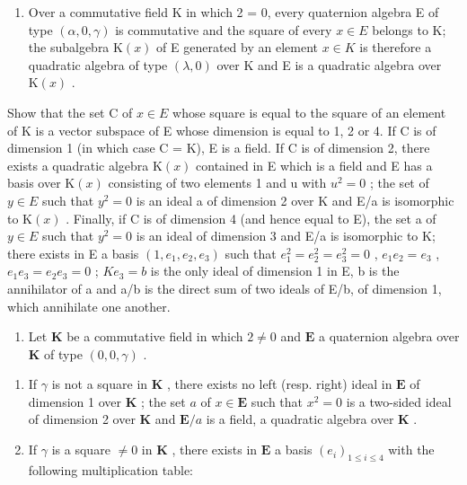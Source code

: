 \begin{enumerate}
\def\labelenumi{\arabic{enumi}.}
\setcounter{enumi}{4}
\tightlist
\item
  Over a commutative field K in which 2 = 0, every quaternion algebra E of type \((\alpha, 0, \gamma)\) is commutative and the square of every \(x \in E\) belongs to K; the subalgebra \(\mathrm{K}(x)\) of E generated by an element \(x \in K\) is therefore a quadratic algebra of type \((\lambda, 0)\) over K and E is a quadratic algebra over \(\mathrm{K}(x)\) .
\end{enumerate}

Show that the set C of \(x \in E\) whose square is equal to the square of an element of K is a vector subspace of E whose dimension is equal to 1, 2 or 4. If C is of dimension 1 (in which case C = K), E is a field. If C is of dimension 2, there exists a quadratic algebra \(\mathrm{K}(x)\) contained in E which is a field and E has a basis over \(\mathrm{K}(x)\) consisting of two elements 1 and u with \(u^{2} = 0\) ; the set of \(y \in E\) such that \(y^{2} = 0\) is an ideal a of dimension 2 over K and E/a is isomorphic to \(\mathrm{K}(x)\) . Finally, if C is of dimension 4 (and hence equal to E), the set a of \(y \in E\) such that \(y^{2} = 0\) is an ideal of dimension 3 and E/a is isomorphic to K; there exists in E a basis \((1, e_{1}, e_{2}, e_{3})\) such that \(e_{1}^{2} = e_{2}^{2} = e_{3}^{2} = 0\) , \(e_{1}e_{2} = e_{3}\) , \(e_{1}e_{3} = e_{2}e_{3} = 0\) ; \(Ke_{3} = b\) is the only ideal of dimension 1 in E, b is the annihilator of a and a/b is the direct sum of two ideals of E/b, of dimension 1, which annihilate one another.

\begin{enumerate}
\def\labelenumi{\arabic{enumi}.}
\setcounter{enumi}{5}
\tightlist
\item
  Let \(\mathbf{K}\) be a commutative field in which \(2 \neq 0\) and \(\mathbf{E}\) a quaternion algebra over \(\mathbf{K}\) of type \((0, 0, \gamma)\) .
\end{enumerate}

\begin{enumerate}
\def\labelenumi{(\alph{enumi})}
\item
  If \(\gamma\) is not a square in \(\mathbf{K}\) , there exists no left (resp. right) ideal in \(\mathbf{E}\) of dimension 1 over \(\mathbf{K}\) ; the set \(a\) of \(x \in \mathbf{E}\) such that \(x^2 = 0\) is a two-sided ideal of dimension 2 over \(\mathbf{K}\) and \(\mathbf{E} / a\) is a field, a quadratic algebra over \(\mathbf{K}\) .
\item
  If \(\gamma\) is a square \(\neq 0\) in \(\mathbf{K}\) , there exists in \(\mathbf{E}\) a basis \((e_i)_{1\leq i\leq 4}\) with the following multiplication table:
\end{enumerate}

